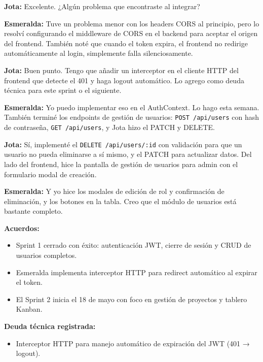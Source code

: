 \documentclass[12pt, a4paper]{article}
\newcommand{\jota}[1]{\noindent\textbf{\color{primary}Jota:} #1\par\smallskip}
\newcommand{\esme}[1]{\noindent\textbf{\color{accentgreen}Esmeralda:} #1\par\smallskip}
\begin{document}
\jota{Excelente. ¿Algún problema que encontraste al integrar?}

\esme{Tuve un problema menor con los headers CORS al principio, pero lo resolví configurando el middleware de CORS en el backend para aceptar el origen del frontend. También noté que cuando el token expira, el frontend no redirige automáticamente al login, simplemente falla silenciosamente.}

\jota{Buen punto. Tengo que añadir un interceptor en el cliente HTTP del frontend que detecte el 401 y haga logout automático. Lo agrego como deuda técnica para este sprint o el siguiente.}

\esme{Yo puedo implementar eso en el AuthContext. Lo hago esta semana. También terminé los endpoints de gestión de usuarios: \texttt{POST /api/users} con hash de contraseña, \texttt{GET /api/users}, y Jota hizo el PATCH y DELETE.}

\jota{Sí, implementé el \texttt{DELETE /api/users/:id} con validación para que un usuario no pueda eliminarse a sí mismo, y el PATCH para actualizar datos. Del lado del frontend, hice la pantalla de gestión de usuarios para admin con el formulario modal de creación.}

\esme{Y yo hice los modales de edición de rol y confirmación de eliminación, y los botones en la tabla. Creo que el módulo de usuarios está bastante completo.}

\begin{acuerdobox}
\textbf{Acuerdos:}
\begin{itemize}[leftmargin=1.2em, topsep=2pt]
  \item Sprint 1 cerrado con éxito: autenticación JWT, cierre de sesión y CRUD de usuarios completos.
  \item Esmeralda implementa interceptor HTTP para redirect automático al expirar el token.
  \item El Sprint 2 inicia el 18 de mayo con foco en gestión de proyectos y tablero Kanban.
\end{itemize}
\end{acuerdobox}

\begin{pendientebox}
\textbf{Deuda técnica registrada:}
\begin{itemize}[leftmargin=1.2em, topsep=2pt]
  \item Interceptor HTTP para manejo automático de expiración del JWT (401 → logout).
\end{itemize}
\end{pendientebox}
\end{document}
